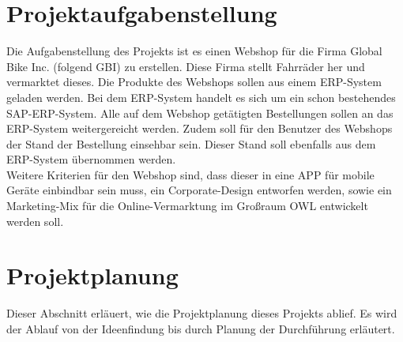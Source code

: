 \newpage
\section{Projektaufgabenstellung}
Die Aufgabenstellung des Projekts ist es einen Webshop für die Firma Global Bike Inc. (folgend GBI) zu erstellen. Diese Firma stellt Fahrräder her und vermarktet dieses. Die Produkte des Webshops sollen aus einem ERP-System geladen werden. Bei dem ERP-System handelt es sich um ein schon bestehendes SAP-ERP-System. Alle auf dem Webshop getätigten Bestellungen sollen an das ERP-System weitergereicht werden. Zudem soll für den Benutzer des Webshops der Stand der Bestellung einsehbar sein. Dieser Stand soll ebenfalls aus dem ERP-System übernommen werden. \\
Weitere Kriterien für den Webshop sind, dass dieser in eine APP für mobile Geräte einbindbar sein muss, ein Corporate-Design entworfen werden, sowie ein Marketing-Mix für die Online-Vermarktung im Großraum OWL entwickelt werden soll.

\section{Projektplanung}
Dieser Abschnitt erläuert, wie die Projektplanung dieses Projekts ablief. Es wird der Ablauf von der Ideenfindung bis durch Planung der Durchführung erläutert.

